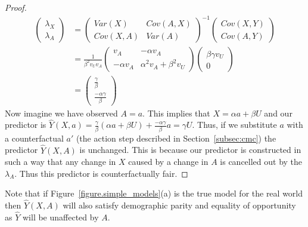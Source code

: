 \begin{proof}
\begin{align}
\begin{pmatrix}
\lambda_X \\
\lambda_A
\end{pmatrix} &=
\begin{pmatrix}
Var(X) & Cov(A,X) \\
Cov(X,A) & Var(A)
\end{pmatrix}^{-1}
\begin{pmatrix}
Cov(X,Y) \\
Cov(A,Y)
\end{pmatrix} \nonumber \\
&=
\frac{1}{\beta^2 v_U v_A}
\begin{pmatrix}
v_A & -\alpha v_A \\
-\alpha v_A & \alpha^2 v_A + \beta^2 v_U
\end{pmatrix}
\begin{pmatrix}
\beta \gamma v_U \\
0
\end{pmatrix} \nonumber \\
&=
\begin{pmatrix}
\frac{\gamma}{\beta} \\
\frac{-\alpha\gamma}{\beta}
\end{pmatrix}
\end{align}
Now imagine we have observed $A\!=\!a$. This implies that $X = \alpha
a + \beta U$ and our predictor is $\hat Y(X,a) =
\frac{\gamma}{\beta}(\alpha a + \beta U) + \frac{-\alpha\gamma}{\beta}
a = \gamma U$. Thus, if we substitute $a$ with a counterfactual $a'$
(the action step described in Section~\ref{subsec:cmc}) the predictor
$\hat Y(X,A)$ is unchanged. This is because our predictor is
constructed in such a way that any change in $X$ caused by a change in
$A$ is cancelled out by the $\lambda_A$. Thus this predictor is
counterfactually fair.
\end{proof}

Note that if Figure~\ref{figure.simple_models}(a) is the
true model for the real world then $\hat Y(X,A)$ will also satisfy
demographic parity and equality of opportunity as $\hat Y$ will be
unaffected by $A$. 

